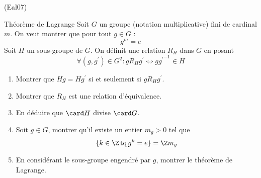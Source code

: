 \begin{tiny}(Eal07)\end{tiny} Théorème de Lagrange \newline
Soit $G$ un groupe (notation multiplicative) fini de cardinal $m$. On veut montrer que pour tout $g\in G$ :
\begin{displaymath}
g^m=e 
\end{displaymath}
Soit $H$ un sous-groupe de $G$. On définit une relation $R_H$ dans $G$ en posant
\begin{displaymath}
\forall (g,g^\prime)\in G^2 : g R_H g^\prime \Leftrightarrow g{g^\prime}^{-1}\in H
\end{displaymath}
\begin{enumerate}
\item Montrer que $Hg = Hg^\prime$ si et seulement si $g R_H g^\prime$.
\item Montrer que $R_H$ est une relation d'équivalence.
\item En déduire que $\card H$ divise $\card G$.
\item Soit $g\in G$, montrer qu'il existe un entier $m_g>0$ tel que 
\[\{k\in \Z \,\mathrm{ tq }\, g^k=e\}=\Z m_g\]
\item En considérant le sous-groupe engendré par $g$, montrer le théorème de Lagrange.
\end{enumerate}
